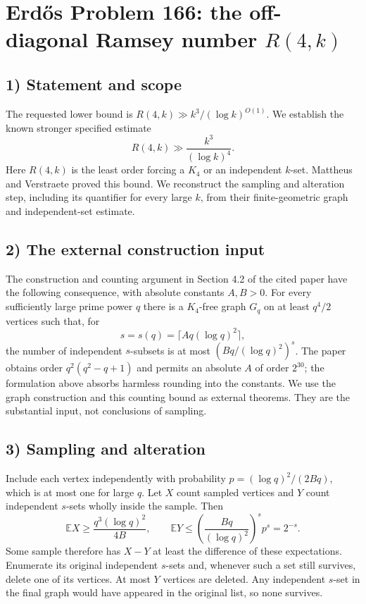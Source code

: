 \section{Erd\H{o}s Problem 166: the off-diagonal Ramsey number $R(4,k)$}

\subsection{1) Statement and scope}
The requested lower bound is $R(4,k)\gg k^3/(\log k)^{O(1)}$.
We establish the known stronger specified estimate
\[
 R(4,k)\gg\frac{k^3}{(\log k)^4}.
\]
Here $R(4,k)$ is the least order forcing a $K_4$ or an independent
$k$-set. Mattheus and Verstraete proved this bound. We reconstruct the
sampling and alteration step, including its quantifier for every large
$k$, from their finite-geometric graph and independent-set estimate.

\subsection{2) The external construction input}
The construction and counting argument in Section 4.2 of the cited
paper have the following consequence, with absolute constants $A,B>0$.
For every sufficiently large prime power $q$ there is a $K_4$-free graph
$G_q$ on at least $q^4/2$ vertices such that, for
\[
 s=s(q)=\lceil Aq(\log q)^2\rceil,
\]
the number of independent $s$-subsets is at most
$(Bq/(\log q)^2)^s$. The paper obtains order
$q^2(q^2-q+1)$ and permits an absolute $A$ of order $2^{30}$;
the formulation above absorbs harmless rounding into the constants.
We use the graph construction and this counting bound as external
theorems. They are the substantial input, not conclusions of sampling.

\subsection{3) Sampling and alteration}
Include each vertex independently with probability
$p=(\log q)^2/(2Bq)$, which is at most one for large $q$.
Let $X$ count sampled vertices and $Y$ count independent $s$-sets wholly
inside the sample. Then
\[
 \mathbb E X\geq \frac{q^3(\log q)^2}{4B},\qquad
 \mathbb E Y\leq
 \left(\frac{Bq}{(\log q)^2}\right)^sp^s=2^{-s}.
\]
Some sample therefore has $X-Y$ at least the difference of these
expectations. Enumerate its original independent $s$-sets and, whenever
such a set still survives, delete one of its vertices. At most $Y$
vertices are deleted. Any independent $s$-set in the final graph would
have appeared in the original list, so none survives.

